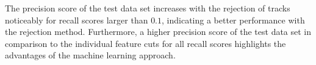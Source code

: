 The precision score of the test data set increases with the rejection of tracks noticeably for recall scores larger than $0.1$, indicating a better performance with the rejection method.
Furthermore, a higher precision score of the test data set in comparison to the individual feature cuts for all recall scores highlights the advantages of the machine
learning approach. 
